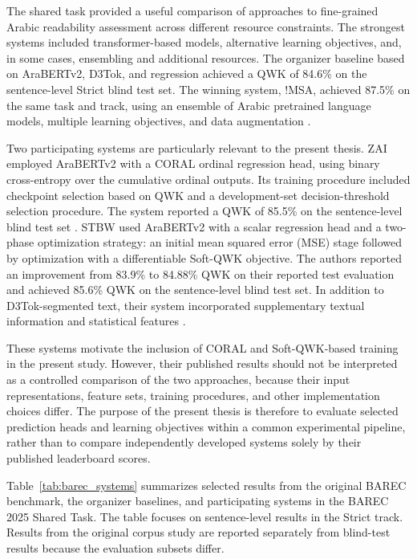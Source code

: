 \documentclass[12pt]{report}
\begin{document}
The shared task provided a useful comparison of approaches to fine-grained Arabic readability assessment across different resource constraints. The strongest systems included transformer-based models, alternative learning objectives, and, in some cases, ensembling and additional resources. The organizer baseline based on AraBERTv2, D3Tok, and regression achieved a QWK of 84.6\% on the sentence-level Strict blind test set. The winning system, !MSA, achieved 87.5\% on the same task and track, using an ensemble of Arabic pretrained language models, multiple learning objectives, and data augmentation \cite{elmadani2025sharedtask}.

Two participating systems are particularly relevant to the present thesis. ZAI employed AraBERTv2 with a CORAL ordinal regression head, using binary cross-entropy over the cumulative ordinal outputs. Its training procedure included checkpoint selection based on QWK and a development-set decision-threshold selection procedure. The system reported a QWK of 85.5\% on the sentence-level blind test set \cite{nazzal2025zai}. STBW used AraBERTv2 with a scalar regression head and a two-phase optimization strategy: an initial mean squared error (MSE) stage followed by optimization with a differentiable Soft-QWK objective. The authors reported an improvement from 83.9\% to 84.88\% QWK on their reported test evaluation and achieved 85.6\% QWK on the sentence-level blind test set. In addition to D3Tok-segmented text, their system incorporated supplementary textual information and statistical features \cite{trigui2025stbw}.

These systems motivate the inclusion of CORAL and Soft-QWK-based training in the present study. However, their published results should not be interpreted as a controlled comparison of the two approaches, because their input representations, feature sets, training procedures, and other implementation choices differ. The purpose of the present thesis is therefore to evaluate selected prediction heads and learning objectives within a common experimental pipeline, rather than to compare independently developed systems solely by their published leaderboard scores.

Table~\ref{tab:barec_systems} summarizes selected results from the original BAREC benchmark, the organizer baselines, and participating systems in the BAREC 2025 Shared Task. The table focuses on sentence-level results in the Strict track. Results from the original corpus study are reported separately from blind-test results because the evaluation subsets differ.
\end{document}
